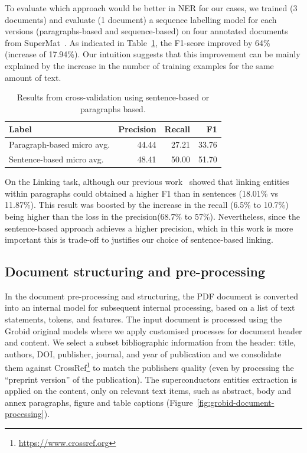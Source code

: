 \documentclass{article}
\begin{document}
To evaluate which approach would be better in NER for our cases, we trained (3 documents) and evaluate (1 document) a sequence labelling model for each versions (paragraphs-based and sequence-based) on four annotated documents from SuperMat~\cite{foppiano2021supermat}.
As indicated in Table~\ref{tab:comparison-evaluation-sentences-paragraphs}, the F1-score improved by 64\% (increase of 17.94\%).
Our intuition suggests that this improvement can be mainly explained by the increase in the number of training examples for the same amount of text.

\begin{table}[ht]
\centering\small
\begin{tabular}{lrrr}
\toprule
\textbf{Label} & \textbf{Precision} & \textbf{Recall} & \textbf{F1} \\
\midrule
Paragraph-based micro avg. & 44.44 & 27.21 & 33.76   \\
Sentence-based micro avg. & 48.41 & 50.00 & 51.70  \\
\bottomrule
\end{tabular}
\caption{\label{tab:comparison-evaluation-sentences-paragraphs} Results from cross-validation using sentence-based or paragraphs based.  }
\end{table}

On the Linking task, although our previous work~\cite{foppiano2019proposal} showed that linking entities within paragraphs could obtained a higher F1 than in sentences (18.01\% vs 11.87\%). This result was boosted by the increase in the recall (6.5\% to 10.7\%) being higher than the loss in the precision(68.7\% to 57\%).
Nevertheless, since the sentence-based approach achieves a higher precision, which in this work is more important this is trade-off to justifies our choice of sentence-based linking. 

\subsection{Document structuring and pre-processing}
\label{subsubsec:document-structuring}
In the document pre-processing and structuring, the PDF document is converted into an internal model for subsequent internal processing, based on a list of text statements, tokens, and features. 
The input document is processed using the Grobid original models where we apply customised processes for document header and content. 
We select a subset bibliographic information from the header: title, authors, DOI, publisher, journal, and year of publication and we consolidate them against CrossRef\footnote{\url{https://www.crossref.org}} to match the  publishers quality (even by processing the ``preprint version'' of the publication). 
The superconductors entities extraction is applied on the content, only on relevant text items, such as abstract, body and annex paragraphs, figure and table captions (Figure~\ref{fig:grobid-document-processing}).
\end{document}
